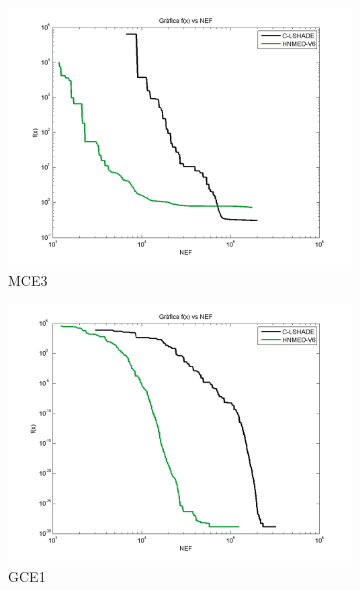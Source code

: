 \begin{figure}
\begin{subfigure}[b]{0.49\linewidth}
		\includegraphics[width=\linewidth]{Figures/F-Grafica_Convergencia_Problema_3}
		\caption{MCE3} \label{fig:M3} 
	\end{subfigure}
	\begin{subfigure}[b]{0.49\linewidth}
		\includegraphics[width=\linewidth]{Figures/F-Grafica_Convergencia_Problema_4}
		\caption{GCE1} \label{fig:G1} 
	\end{subfigure}
	\begin{subfigure}[b]{0.49\linewidth}

\end{subfigure}
\end{figure}
